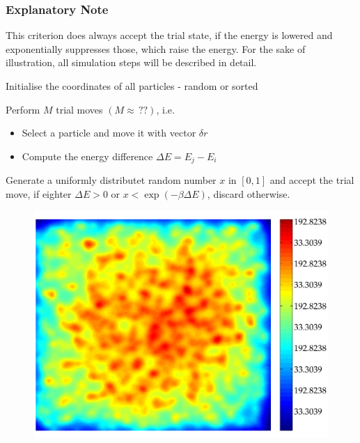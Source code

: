 \subsubsection*{Explanatory Note}
This criterion does always accept the trial state, if the energy is lowered and exponentially suppresses those, which raise the energy.
For the sake of illustration, all simulation steps will be described in detail.
\begin{enumerate}
	\item{Initialise the coordinates of all particles - random or sorted}
	\item{Perform $M$ trial moves $(M \approx\,??)$, i.e.
		\begin{itemize}
			\item{Select a particle and move it with vector $\delta r$}
			\item{Compute the energy difference $\Delta E = E_j - E_i$}
		\end{itemize}
	\item{Generate a uniformly distributet random number $x$ in $[0, 1]$ and accept the trial move, if eighter $\Delta E>0$ or $x < \exp(-\beta\Delta E)$, discard otherwise.}
}
\end{enumerate}

\begin{figure}[ht]
	\includegraphics[width=\textwidth]{Figures/TestFrame.pdf}
\end{figure}
